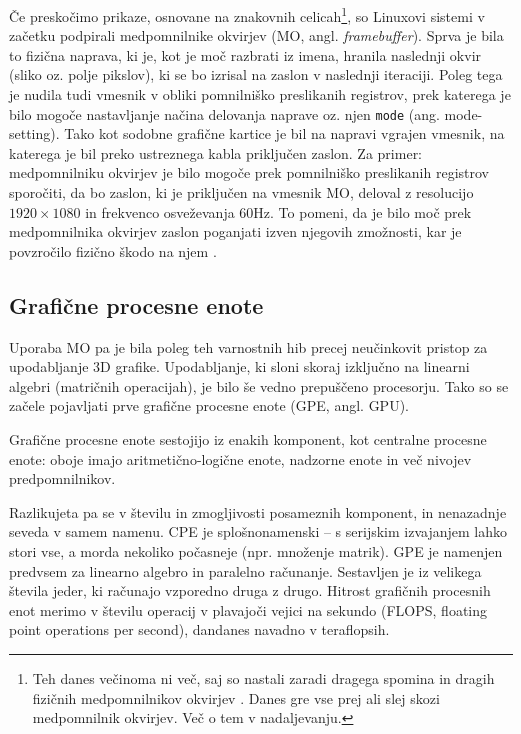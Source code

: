 \documentclass{article}
\begin{document}
Če preskočimo prikaze, osnovane na znakovnih celicah\footnote{Teh danes večinoma ni več, saj so nastali zaradi dragega spomina in dragih fizičnih medpomnilnikov okvirjev \autocite{textmode}. Danes gre vse prej ali slej skozi medpomnilnik okvirjev. Več o tem v nadaljevanju.}, so Linuxovi sistemi v začetku podpirali medpomnilnike okvirjev (MO, angl. \textit{framebuffer}). Sprva je bila to fizična naprava, ki je, kot je moč razbrati iz imena, hranila naslednji okvir (sliko oz. polje pikslov), ki se bo izrisal na zaslon v naslednji iteraciji. Poleg tega je nudila tudi vmesnik v obliki pomnilniško preslikanih registrov, prek katerega je bilo mogoče nastavljanje načina delovanja naprave oz. njen \texttt{mode} (ang. mode-setting). Tako kot sodobne grafične kartice je bil na napravi vgrajen vmesnik, na katerega je bil preko ustreznega kabla priključen zaslon. Za primer: medpomnilniku okvirjev je bilo mogoče prek pomnilniško preslikanih registrov sporočiti, da bo zaslon, ki je priključen na vmesnik MO, deloval z resolucijo $1920 \times 1080$ in frekvenco osveževanja $60$Hz.
To pomeni, da je bilo moč prek medpomnilnika okvirjev zaslon poganjati izven njegovih zmožnosti, kar je povzročilo fizično škodo na njem \autocite[Poglavje Display Modes]{framebuffer} \autocite{overdrive}.

\subsection{Grafične procesne enote}
Uporaba MO pa je bila poleg teh varnostnih hib precej neučinkovit pristop za upodabljanje 3D grafike. Upodabljanje, ki sloni skoraj izključno na linearni algebri (matričnih operacijah), je bilo še vedno prepuščeno procesorju. Tako so se začele pojavljati prve grafične procesne enote (GPE, angl. GPU).

Grafične procesne enote sestojijo iz enakih komponent, kot centralne procesne enote: oboje imajo aritmetično-logične enote, nadzorne enote in več nivojev predpomnilnikov. \autocite{framebuffer}

Razlikujeta pa se v številu in zmogljivosti posameznih komponent, in nenazadnje seveda v samem namenu. CPE je splošnonamenski -- s serijskim izvajanjem lahko stori vse, a morda nekoliko počasneje (npr. množenje matrik). GPE je namenjen predvsem za linearno algebro in paralelno računanje. Sestavljen je iz velikega števila jeder, ki računajo vzporedno druga z drugo. Hitrost grafičnih procesnih enot merimo v številu operacij v plavajoči vejici na sekundo (FLOPS, floating point operations per second), dandanes navadno v teraflopsih.
\end{document}
